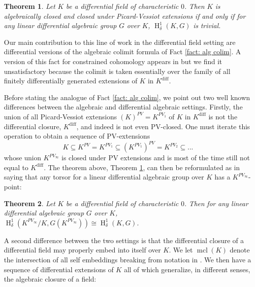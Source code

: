 \documentclass{amsart}
\newtheorem{theorem}{Theorem}[section]
\theoremstyle{definition}
\theoremstyle{remark}
\numberwithin{equation}{section}
\def \HH {\operatorname{H}}
\def \diff {\operatorname{diff}}
\def \mcl {\operatorname{mcl}}
\begin{document}
\begin{theorem}\label{thm: diff triviality}\cite{PILLAY2017809}
    Let $K$ be a differential field of characteristic $0$. Then $K$ is algebraically closed and closed under Picard-Vessiot extensions if and only if for any linear differential algebraic group $G$ over $K$, 
    $\HH_{\delta}^{1}(K,G)$ is trivial.
\end{theorem}

Our main contribution to this line of work in the differential field setting are differential versions of the algebraic colimit formula of Fact \ref{fact: alg colim}. A version of this fact for constrained cohomology appears in \cite{kolchin1985differential} but we find it unsatisfactory because the colimit is taken essentially over the family of all finitely differentially generated extensions of $K$ in $K^{\diff}$. 

Before stating the analogue of Fact \ref{fact: alg colim}, we point out two well known differences between the algebraic and differential algebraic settings. Firstly, the union of all Picard-Vessiot extensions $(K)^{PV} = K^{PV_{1}}$ of $K$ in $K^{\diff}$ is not the differential closure, $K^{\diff}$, and indeed is not even PV-closed. One must iterate this operation to obtain a sequence of PV-extensions $$K \subseteq K^{PV} = K^{PV_1} \subseteq (K^{PV_1})^{PV} = K^{PV_2} \subseteq ... $$ whose union $K^{PV_\infty}$ is closed under PV extensions and is most of the time still not equal to $K^{\diff}$. The theorem above, Theorem \ref{thm: diff triviality}, can then be reformulated as in \cite{AnandDavidComm} saying that any torsor for a linear differential algebraic group over $K$ has a $K^{PV_{\infty}}$-point:

\begin{theorem}\label{thm: diff triviality in PV}\cite{AnandDavidComm}
    Let $K$ be a differential field of characteristic $0$. Then for any linear differential algebraic group $G$ over $K$, 
    $\HH_{\delta}^{1}(K^{PV_\infty}/K,G(K^{PV_\infty})) \cong \HH_{\delta}^{1}(K,G)$.
\end{theorem}

A second difference between the two settings is that the differential closure of a differential field may properly embed into itself over $K$. We let $\mcl(K)$ denote the intersection of all self embeddings breaking from notation in \cite{meretzky2026galoistheoryautomorphismgroups}. We then have a sequence of differential extensions of $K$ all of which generalize, in different senses, the algebraic closure of a field:
\end{document}
